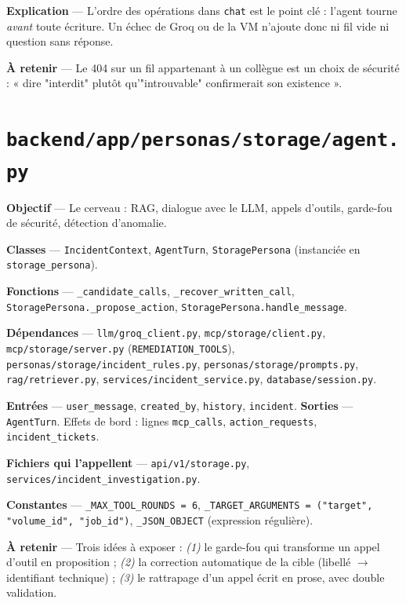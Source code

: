 \documentclass[11pt,a4paper]{report}
\newcommand{\file}[1]{\texttt{\small #1}}
\newcommand{\fn}[1]{\texttt{\small\textcolor{oasisviolet}{#1}}}
\newcommand{\cls}[1]{\texttt{\small\textcolor{oasisblue}{#1}}}
\newcommand{\tbl}[1]{\texttt{\small\textcolor{oasisamber}{#1}}}
\newcommand{\arrowto}{\ensuremath{\rightarrow}}
\begin{document}
\textbf{Explication} --- L'ordre des opérations dans \fn{chat} est le point clé :
l'agent tourne \emph{avant} toute écriture. Un échec de Groq ou de la VM
n'ajoute donc ni fil vide ni question sans réponse.

\textbf{À retenir} --- Le 404 sur un fil appartenant à un collègue est un choix de
sécurité : « dire "interdit" plutôt qu'"introuvable" confirmerait son
existence ».

\section{\file{backend/app/personas/storage/agent.py}}

\textbf{Objectif} --- Le cerveau : RAG, dialogue avec le LLM, appels d'outils,
garde-fou de sécurité, détection d'anomalie.

\textbf{Classes} --- \cls{IncidentContext}, \cls{AgentTurn},
\cls{StoragePersona} (instanciée en \fn{storage\_persona}).

\textbf{Fonctions} --- \fn{\_candidate\_calls}, \fn{\_recover\_written\_call},
\fn{StoragePersona.\_propose\_action}, \fn{StoragePersona.handle\_message}.

\textbf{Dépendances} --- \file{llm/groq\_client.py}, \file{mcp/storage/client.py},
\file{mcp/storage/server.py} (\texttt{REMEDIATION\_TOOLS}),
\file{personas/storage/incident\_rules.py},
\file{personas/storage/prompts.py}, \file{rag/retriever.py},
\file{services/incident\_service.py}, \file{database/session.py}.

\textbf{Entrées} --- \texttt{user\_message}, \texttt{created\_by},
\texttt{history}, \texttt{incident}.
\textbf{Sorties} --- \cls{AgentTurn}. Effets de bord : lignes
\tbl{mcp\_calls}, \tbl{action\_requests}, \tbl{incident\_tickets}.

\textbf{Fichiers qui l'appellent} --- \file{api/v1/storage.py},
\file{services/incident\_investigation.py}.

\textbf{Constantes} --- \texttt{\_MAX\_TOOL\_ROUNDS = 6},
\texttt{\_TARGET\_ARGUMENTS = ("target", "volume\_id", "job\_id")},
\texttt{\_JSON\_OBJECT} (expression régulière).

\textbf{À retenir} --- Trois idées à exposer : \emph{(1)} le garde-fou qui
transforme un appel d'outil en proposition ; \emph{(2)} la correction
automatique de la cible (libellé \arrowto{} identifiant technique) ; \emph{(3)}
le rattrapage d'un appel écrit en prose, avec double validation.
\end{document}
